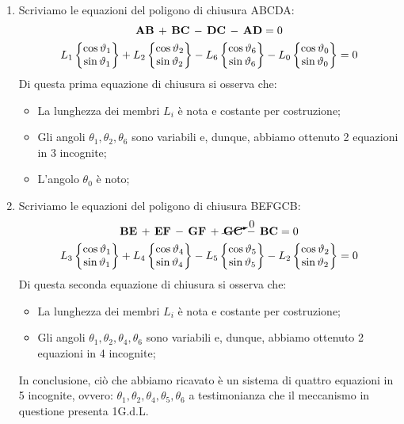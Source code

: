 		\begin{enumerate}
		\item Scriviamo le equazioni del poligono di chiusura ABCDA:
		\begin{gather*}
		\mathbf{AB}\,+\,\mathbf{BC}\,-\,\mathbf{DC}\,-\,\mathbf{AD} = 0\\
		L_1\begin{Bmatrix}\cos{\vartheta_1}\\\sin{\vartheta_1}\end{Bmatrix}+L_2\begin{Bmatrix}\cos{\vartheta_2}\\\sin{\vartheta_2}\end{Bmatrix}-L_6\begin{Bmatrix}\cos{\vartheta_6}\\\sin{\vartheta_6}\end{Bmatrix}-L_0\begin{Bmatrix}\cos{\vartheta_0}\\\sin{\vartheta_0}\end{Bmatrix}=0
		\end{gather*}
		Di questa prima equazione di chiusura si osserva che:
		\begin{itemize}
			\item La lunghezza dei membri $L_i$ è nota e costante per costruzione;
			\item Gli angoli $\theta_1, \theta_2, \theta_6$ sono variabili e, dunque, abbiamo ottenuto 2 equazioni in 3 incognite;
			\item L'angolo $\theta_0$ è noto;
		\end{itemize}
		\item Scriviamo le equazioni del poligono di chiusura BEFGCB:
			\begin{gather*}
			\mathbf{BE}\,+\,\mathbf{EF}\,-\,\mathbf{GF}\,+\,\cancelto{0}{\mathbf{GC}}\,-\,\mathbf{BC} = 0\\
			L_3\begin{Bmatrix}\cos{\vartheta_1}\\\sin{\vartheta_1}\end{Bmatrix}+L_4\begin{Bmatrix}\cos{\vartheta_4}\\\sin{\vartheta_4}\end{Bmatrix}-L_5\begin{Bmatrix}\cos{\vartheta_5}\\\sin{\vartheta_5}\end{Bmatrix}-L_2\begin{Bmatrix}\cos{\vartheta_2}\\\sin{\vartheta_2}\end{Bmatrix}=0
			\end{gather*}
			Di questa seconda equazione di chiusura si osserva che:
			\begin{itemize}
				\item La lunghezza dei membri $L_i$ è nota e costante per costruzione;
				\item Gli angoli $\theta_1, \theta_2, \theta_4, \theta_6$ sono variabili e, dunque, abbiamo ottenuto 2 equazioni in 4 incognite;
			\end{itemize}
			In conclusione, ciò che abbiamo ricavato è un sistema di quattro equazioni in 5 incognite, ovvero: $\theta_1, \theta_2, \theta_4, \theta_5, \theta_6$ a testimonianza che il meccanismo in questione presenta 1G.d.L.
		\end{enumerate}
		
